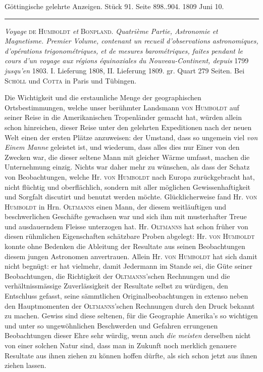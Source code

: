 \clearpage
{}
\hypertarget{native-517-lower}{}\label{native-517-lower}
\begin{center}\small Göttingische gelehrte Anzeigen. Stück 91. Seite 898..904. 1809 Juni 10.\\[3pt]\rule{.72\linewidth}{.3pt}\end{center}

\emph{Voyage} \textsc{de Humboldt} \emph{et} \textsc{Bonpland}. \emph{Quatrième Partie, Astronomie et Magnetisme. Premier Volume, contenant un recueil d'observations astronomiques, d'opérations trigonométriques, et de mesures barométriques, faites pendant le cours d'un voyage aux régions équinoxiales du Nouveau-Continent, depuis} 1799 \emph{jusqu'en} 1803. I. Lieferung 1808, II. Lieferung 1809. gr. Quart 279 Seiten. Bei \textsc{Schöll} und \textsc{Cotta} in Paris und Tübingen.

Die Wichtigkeit und die erstaunliche Menge der geographischen Ortsbestimmungen, welche unser berühmter Landsmann \textsc{von Humboldt} auf seiner Reise in die Amerikanischen Tropenländer gemacht hat, würden allein schon hinreichen, dieser Reise unter den gelehrten Expeditionen nach der neuen Welt einen der ersten Plätze anzuweisen: der Umstand, dass so ungemein viel \emph{von Einem Manne} geleistet ist, und wiederum, dass alles dies nur Einer von den Zwecken war, die dieser seltene Mann mit gleicher Wärme umfasst, machen die Unternehmung einzig. Nichts war daher mehr zu wünschen, als dass der Schatz von Beobachtungen, welche Hr. \textsc{von Humboldt} nach Europa zurückgebracht hat, nicht flüchtig und oberflächlich, sondern mit aller möglichen Gewissenhaftigkeit und Sorgfalt discutirt und benutzt werden möchte. Glücklicherweise fand Hr. \textsc{von Humboldt} in Hrn. \textsc{Oltmanns} einen Mann, der diesem weitläuftigen und beschwerlichen Geschäfte gewachsen war und sich ihm mit musterhafter Treue und ausdauerndem Fleisse unterzogen hat. Hr. \textsc{Oltmanns} hat schon früher von diesen rühmlichen Eigenschaften schätzbare Proben abgelegt: Hr. \textsc{von Humboldt} konnte ohne Bedenken die Ableitung der Resultate aus seinen Beobachtungen diesem jungen Astronomen anvertrauen. Allein Hr. \textsc{von Humboldt} hat sich damit nicht begnügt: er hat vielmehr, damit Jedermann im Stande sei, die Güte seiner Beobachtungen, die Richtigkeit der \textsc{Oltmanns}'schen Rechnungen und die verhältnissmässige Zuverlässigkeit der Resultate selbst zu würdigen, den Entschluss gefasst, seine sämmtlichen Originalbeobachtungen in extenso neben den Hauptmomenten der \textsc{Oltmanns}'schen Rechnungen durch den Druck bekannt zu machen. Gewiss sind diese seltenen, für die Geographie Amerika's so wichtigen und unter so ungewöhnlichen Beschwerden und Gefahren errungenen Beobachtungen dieser Ehre sehr würdig, wenn auch \emph{die meisten} derselben nicht von einer solchen Natur sind, dass man in Zukunft noch merklich genauere Resultate aus ihnen ziehen zu können hoffen dürfte, als sich schon jetzt aus ihnen ziehen lassen.

